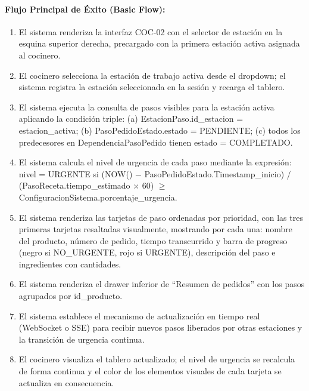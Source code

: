 \paragraph{Flujo Principal de Éxito (Basic Flow):}
\begin{enumerate}
    \item[I.] El sistema renderiza la interfaz COC-02 con el selector de estación en la esquina superior derecha, precargado con la primera estación activa asignada al cocinero.
    \item[II.] El cocinero selecciona la estación de trabajo activa desde el dropdown; el sistema registra la estación seleccionada en la sesión y recarga el tablero.
    \item[III.] El sistema ejecuta la consulta de pasos visibles para la estación activa aplicando la condición triple: (a) EstacionPaso.id\_estacion = estacion\_activa; (b) PasoPedidoEstado.estado = PENDIENTE; (c) todos los predecesores en DependenciaPasoPedido tienen estado = COMPLETADO.
    \item[IV.] El sistema calcula el nivel de urgencia de cada paso mediante la expresión: nivel = URGENTE si (NOW() $-$ PasoPedidoEstado.Timestamp\_inicio) / (PasoReceta.tiempo\_estimado $\times$ 60) $\ge$ ConfiguracionSistema.porcentaje\_urgencia.
    \item[V.] El sistema renderiza las tarjetas de paso ordenadas por prioridad, con las tres primeras tarjetas resaltadas visualmente, mostrando por cada una: nombre del producto, número de pedido, tiempo transcurrido y barra de progreso (negro si NO\_URGENTE, rojo si URGENTE), descripción del paso e ingredientes con cantidades.
    \item[VI.] El sistema renderiza el drawer inferior de ``Resumen de pedidos'' con los pasos agrupados por id\_producto.
    \item[VII.] El sistema establece el mecanismo de actualización en tiempo real (WebSocket o SSE) para recibir nuevos pasos liberados por otras estaciones y la transición de urgencia continua.
    \item[VIII.] El cocinero visualiza el tablero actualizado; el nivel de urgencia se recalcula de forma continua y el color de los elementos visuales de cada tarjeta se actualiza en consecuencia.
\end{enumerate}

